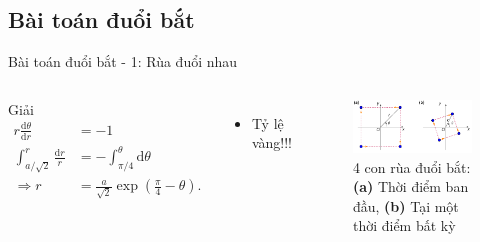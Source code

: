 \subsection{Bài toán đuổi bắt}

\begin{frame}{Bài toán đuổi bắt - 1: Rùa đuổi nhau}
    \begin{columns}
            Giải
            \begin{align*}
                r \frac{\mathrm{d} \theta}{\mathrm{d} r} &= -1 \\
                \int_{a/\sqrt{2}}^r \frac{\mathrm{d} r}{r} &= - \int_{\pi/4}^\theta \mathrm{d} \theta  \\
                \Rightarrow r &= \frac{a}{\sqrt{2}} \exp \left( \frac{\pi}{4} -\theta \right).
            \end{align*}

            \begin{itemize}
                \item Tỷ lệ vàng!!!
            \end{itemize}
        \begin{figure}
            \centering
            \includegraphics[width=0.9\linewidth]{Figures/Turtles_ninja.pdf}
            \caption{4 con rùa đuổi bắt: \textbf{(a)} Thời điểm ban đầu, \textbf{(b)} Tại một thời điểm bất kỳ}
            \label{fig:Turtles_ninja}
        \end{figure}
    \end{columns}
\end{frame}


